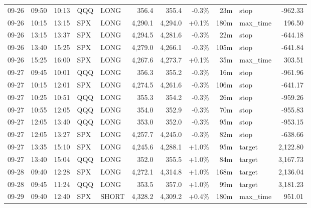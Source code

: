\documentclass[11pt,a4paper,twoside]{article}
\begin{document}
\begin{center}
\begin{longtable}{>{\color{txtmain}}l l l l l r r r r >{\color{txtmain}}l r}
09-26 & 09:50 & 10:13 & QQQ & LONG & 356.4 & 355.4 & \textcolor{lossred}{-0.3\%} & 23m & stop & \textcolor{lossred}{-962.33} \\
09-26 & 10:15 & 13:15 & SPX & LONG & 4,290.1 & 4,294.0 & \textcolor{wingreen}{+0.1\%} & 180m & max\_time & \textcolor{wingreen}{196.50} \\
09-26 & 13:15 & 13:37 & SPX & LONG & 4,294.5 & 4,281.6 & \textcolor{lossred}{-0.3\%} & 22m & stop & \textcolor{lossred}{-644.18} \\
09-26 & 13:40 & 15:25 & SPX & LONG & 4,279.0 & 4,266.1 & \textcolor{lossred}{-0.3\%} & 105m & stop & \textcolor{lossred}{-641.84} \\
09-26 & 15:25 & 16:00 & SPX & LONG & 4,267.6 & 4,273.7 & \textcolor{wingreen}{+0.1\%} & 35m & max\_time & \textcolor{wingreen}{303.51} \\
09-27 & 09:45 & 10:01 & QQQ & LONG & 356.3 & 355.2 & \textcolor{lossred}{-0.3\%} & 16m & stop & \textcolor{lossred}{-961.96} \\
09-27 & 10:15 & 12:01 & SPX & LONG & 4,274.5 & 4,261.6 & \textcolor{lossred}{-0.3\%} & 106m & stop & \textcolor{lossred}{-641.17} \\
09-27 & 10:25 & 10:51 & QQQ & LONG & 355.3 & 354.2 & \textcolor{lossred}{-0.3\%} & 26m & stop & \textcolor{lossred}{-959.26} \\
09-27 & 10:55 & 12:05 & QQQ & LONG & 354.0 & 352.9 & \textcolor{lossred}{-0.3\%} & 70m & stop & \textcolor{lossred}{-955.83} \\
09-27 & 12:05 & 13:40 & QQQ & LONG & 353.0 & 352.0 & \textcolor{lossred}{-0.3\%} & 95m & stop & \textcolor{lossred}{-953.15} \\
09-27 & 12:05 & 13:27 & SPX & LONG & 4,257.7 & 4,245.0 & \textcolor{lossred}{-0.3\%} & 82m & stop & \textcolor{lossred}{-638.66} \\
09-27 & 13:35 & 15:10 & SPX & LONG & 4,245.6 & 4,288.1 & \textcolor{wingreen}{+1.0\%} & 95m & target & \textcolor{wingreen}{2,122.80} \\
09-27 & 13:40 & 15:04 & QQQ & LONG & 352.0 & 355.5 & \textcolor{wingreen}{+1.0\%} & 84m & target & \textcolor{wingreen}{3,167.73} \\
09-28 & 09:40 & 12:28 & SPX & LONG & 4,272.1 & 4,314.8 & \textcolor{wingreen}{+1.0\%} & 168m & target & \textcolor{wingreen}{2,136.04} \\
09-28 & 09:45 & 11:24 & QQQ & LONG & 353.5 & 357.0 & \textcolor{wingreen}{+1.0\%} & 99m & target & \textcolor{wingreen}{3,181.23} \\
09-29 & 09:40 & 12:40 & SPX & SHORT & 4,328.2 & 4,309.2 & \textcolor{wingreen}{+0.4\%} & 180m & max\_time & \textcolor{wingreen}{951.01} \\

\end{longtable}
\end{center}
\end{document}
